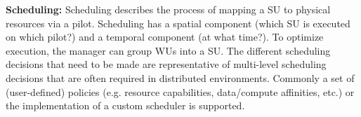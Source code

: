 \documentclass[conference,final]{IEEEtran}
\newcommand{\jhanote}[1]{ {\textcolor{red} { ***shantenu: #1 }}}
\newcommand{\alnote}[1]{ {\textcolor{blue} { ***andre: #1 }}}
\newcommand{\alnote}[1]{}
\newcommand{\jhanote}[1]{}
\begin{document}


\textbf{Scheduling:} Scheduling describes the process of mapping a SU to
physical resources via a pilot. Scheduling has a spatial component (which SU is
executed on which pilot?) and a temporal component (at what time?). To optimize
execution, the manager can group WUs into a SU. The different scheduling
decisions that need to be made are representative of multi-level scheduling
decisions that are often required in distributed environments. Commonly a set of
(user-defined) policies (e.g. resource capabilities, data/compute affinities,
etc.) or the implementation of a custom scheduler is supported.


	
	
\end{document}
